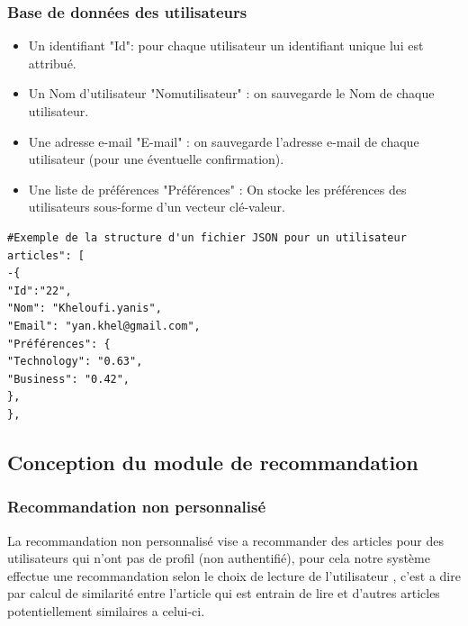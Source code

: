 \subsubsection{Base de données des utilisateurs}

\begin{itemize}
    
    \item Un identifiant "Id": pour chaque utilisateur un identifiant unique lui est attribué.\\
    
    \item Un Nom d'utilisateur "Nomutilisateur" : on sauvegarde le Nom de chaque utilisateur.\\
    
    \item Une adresse e-mail "E-mail" : on sauvegarde l'adresse e-mail de chaque utilisateur (pour une éventuelle confirmation).\\
    
    \item Une liste de préférences "Préférences" : On stocke les préférences des utilisateurs sous-forme d'un vecteur clé-valeur.\\
    
\end{itemize}

\begin{lstlisting}[style=code]
#Exemple de la structure d'un fichier JSON pour un utilisateur
articles": [
-{
"Id":"22",
"Nom": "Kheloufi.yanis",
"Email": "yan.khel@gmail.com",
"Préférences": {
"Technology": "0.63",
"Business": "0.42",
},
},
\end{lstlisting}

\subsection{Conception du module de recommandation}

\subsubsection{Recommandation non personnalisé}
La recommandation non personnalisé vise a recommander des articles pour des utilisateurs qui n'ont pas de profil (non authentifié), pour cela notre système effectue une recommandation selon le choix de lecture de l'utilisateur , c'est a dire par calcul de similarité entre l'article qui est entrain de lire et d'autres articles potentiellement similaires a celui-ci.\\

